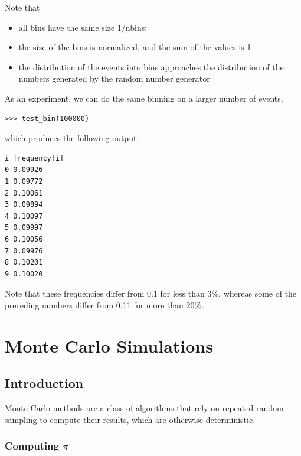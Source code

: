 \documentclass[justified, sixbynine]{tufte-book}
\theoremstyle{plain}%
\newtheorem * {corollary}{Corollary}
\theoremstyle{definition}
\theoremstyle{remark}
\newtheorem * {remark}{Remark}
\newtheorem * {note}{Note}
\begin{document}
\begin{fullwidth}
Note that

\begin{itemize}
\item  all bins have the same size 1/nbins;

\item  the size of the bins is normalized, and the sum of the values is 1

\item  the distribution of the events into bins approaches the distribution
of the numbers generated by the random number generator
\end{itemize}

As an experiment, we can do the same binning on a larger number of events, 
\begin{lstlisting}
>>> test_bin(100000)
\end{lstlisting}

which produces the following output:
\begin{lstlisting}
i frequency[i]
0 0.09926
1 0.09772
2 0.10061
3 0.09894
4 0.10097
5 0.09997
6 0.10056
7 0.09976
8 0.10201
9 0.10020
\end{lstlisting}

Note that these frequencies differ from 0.1 for less than 3\%, whereas some of
the preceding numbers differ from 0.11 for more than 20\%.

\chapter{Monte Carlo Simulations}

\goodbreak\section{Introduction}

Monte Carlo methods are a class of algorithms that rely on repeated random sampling to compute their results, which are otherwise deterministic.

\goodbreak\subsection{Computing $\pi$}


\end{fullwidth}
\end{document}
